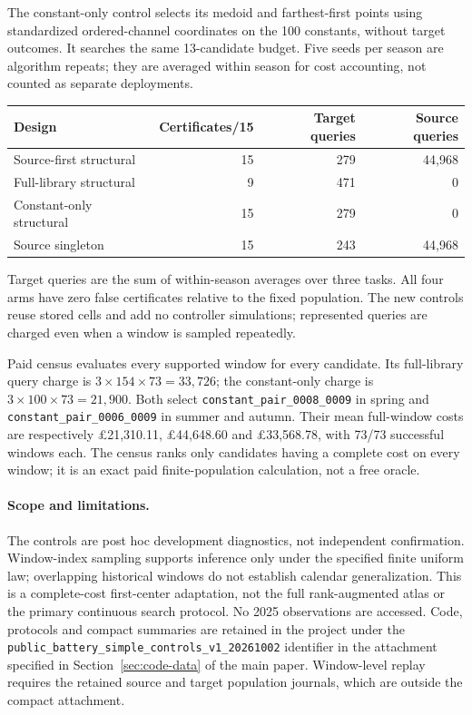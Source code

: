 The constant-only control selects its medoid and farthest-first points using
standardized ordered-channel coordinates on the 100 constants, without
target outcomes.  It searches the same 13-candidate budget.  Five seeds per
season are algorithm repeats; they are averaged within season for cost
accounting, not counted as separate deployments.

\begin{center}
\begin{tabular}{lrrr}
\toprule
Design & Certificates/15 & Target queries & Source queries \\
\midrule
Source-first structural & 15 & 279 & 44,968 \\
Full-library structural & 9 & 471 & 0 \\
Constant-only structural & 15 & 279 & 0 \\
Source singleton & 15 & 243 & 44,968 \\
\bottomrule
\end{tabular}
\end{center}
Target queries are the sum of within-season averages over three tasks.
All four arms have zero false certificates relative to the fixed population.
The new controls reuse stored cells and add no controller simulations;
represented queries are charged even when a window is sampled repeatedly.

Paid census evaluates every supported window for every candidate.  Its
full-library query charge is $3\times154\times73=33,726$; the constant-only
charge is $3\times100\times73=21,900$.  Both select
\texttt{constant\_pair\_0008\_0009} in spring and
\texttt{constant\_pair\_0006\_0009} in summer and autumn.
Their mean full-window costs are respectively \pounds21,310.11,
\pounds44,648.60 and \pounds33,568.78, with 73/73 successful windows each.
The census ranks only candidates having a complete cost on every window;
it is an exact paid finite-population calculation, not a free oracle.

\paragraph{Scope and limitations.}
The controls are post hoc development diagnostics, not independent
confirmation.  Window-index sampling supports inference only under the
specified finite uniform law; overlapping historical windows do not establish
calendar generalization.  This is a complete-cost first-center adaptation,
not the full rank-augmented atlas or the primary continuous search protocol.
No 2025 observations are accessed.  Code, protocols and compact summaries
are retained in the project under the
\texttt{public\_battery\_simple\_controls\_v1\_20261002} identifier
in the attachment specified in Section~\ref{sec:code-data} of the main paper.
Window-level replay requires the retained source and target population
journals, which are outside the compact attachment.


